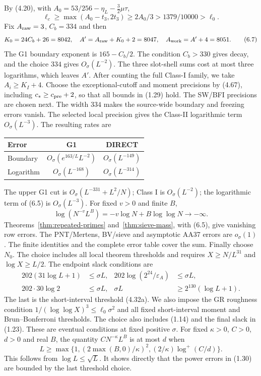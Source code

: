 By (4.20), with $A_0=53/256-\eta_L-\frac32\mu\tau$,
\[
\ell_c\ge\max(A_0-t_3,2t_3)\ge2A_0/3>1379/10000>\ell_0.
\]
Fix $A_{\rm raw}=3$, $C_b=334$ and then
\[
K_0=24C_b+26=8042,\quad A'=A_{\rm raw}+K_0+2=8047,\quad
A_{\rm work}=A'+4=8051.\tag{6.7}
\]
The G1 boundary exponent is $165-C_b/2$.
The condition $C_b>330$ gives decay, and the choice $334$ gives $O_\sigma(L^{-2})$.
The three slot-shell sums cost at most three logarithms, which leaves $A'$.
After counting the full Class-I family, we take $A_i\ge K_I+4$.
Choose the exceptional-cutoff and moment precisions by (4.67), including
$c_*\ge c_{\rm pre}+2$, so that all bounds in (1.29) hold.
The SW/BFI precisions are chosen next.
The width $334$ makes the source-wide boundary and freezing errors vanish.
The selected local precision gives the Class-II logarithmic term
$O_\sigma(L^{-3})$.
The resulting rates are
\begin{center}
\begin{tabular}{@{}lcc@{}}
Error & G1 & DIRECT \\\hline
Boundary & $O_\sigma(e^{163/L}L^{-2})$ & $O_\sigma(L^{-149})$ \\
Logarithm & $O_\sigma(L^{-168})$ & $O_\sigma(L^{-314})$
\end{tabular}
\end{center}
The upper G1 cut is $O_\sigma(L^{-331}+L^2/N)$;
Class I is $O_\sigma(L^{-2})$; the logarithmic term of (6.5) is $O_\sigma(L^{-3})$.
For fixed $v>0$ and finite $B$,
\[
\log(N^{-v}L^B)=-v\log N+B\log\log N\longrightarrow-\infty.
\]
Theorems~\ref{thm:repeated-primes} and~\ref{thm:sieve-mass}, with (6.5), give vanishing row errors.
The PNT/Mertens, BV/sieve and asymptotic AA37 errors are $o_\sigma(1)$.
The finite identities and the complete error table cover the sum.
Finally choose $N_0$. The choice includes all local theorem thresholds and requires $X\ge N/L^{31}$ and $\log X\ge L/2$. The endpoint slack conditions are
\[
\begin{aligned}
202(31\log L+1)&\le\sigma L,
&202\log(2^{24}/\varepsilon_A)&\le\sigma L,\\
202\cdot30\log2&\le\sigma L,
&\sigma L&\ge2^{130}(\log L+1).
\end{aligned}
\]
The last is the short-interval threshold (4.32a).
We also impose the GR roughness condition
$1/(\log\log X)^3\le\ell_0\sigma^2$ and all fixed short-interval moment and Brun--Bonferroni thresholds. The choice also includes (1.14) and the final slack in (1.23).
These are eventual conditions at fixed positive $\sigma$. For fixed $\kappa>0$, $C>0$, $d>0$ and real $B$, the quantity $CN^{-\kappa}L^B$ is at most $d$ when
\[
 L\ge\max\{1,(2\max(B,0)/\kappa)^2,
                         (2/\kappa)\log^+(C/d)\}.
\]
This follows from $\log L\le\sqrt L$. It shows directly that the
power errors in (1.30) are bounded by the last threshold choice.

